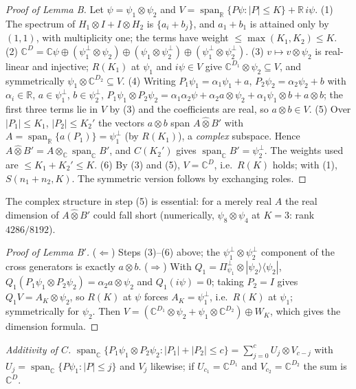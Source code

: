 \documentclass[aps,pra,onecolumn,superscriptaddress,nofootinbib,longbibliography,10pt]{revtex4-2}
\theoremstyle{definition}
\newcommand{\CC}{\mathbb C}
\newcommand{\RR}{\mathbb R}
\newcommand{\spanR}{\operatorname{span}_{\RR}}
\newcommand{\spanC}{\operatorname{span}_{\CC}}
\begin{document}
\begin{proof}[Proof of Lemma B]
Let $\psi=\psi_1\otimes\psi_2$ and $V=\spanR\{P\psi:|P|\le K\}+\RR\,i\psi$.
(1) The spectrum of $H_1\otimes I+I\otimes H_2$ is $\{a_i+b_j\}$, and $a_1+b_1$ is attained only by $(1,1)$, with multiplicity one; the terms have weight $\le\max(K_1,K_2)\le K$.
(2) $\CC^D=\CC\psi\oplus(\psi_1^\perp\otimes\psi_2)\oplus(\psi_1\otimes\psi_2^\perp)\oplus(\psi_1^\perp\otimes\psi_2^\perp)$.
(3) $v\mapsto v\otimes\psi_2$ is real-linear and injective; $R(K_1)$ at $\psi_1$ and $i\psi\in V$ give $\CC^{D_1}\otimes\psi_2\subseteq V$, and symmetrically $\psi_1\otimes\CC^{D_2}\subseteq V$.
(4) Writing $P_1\psi_1=\alpha_1\psi_1+a$, $P_2\psi_2=\alpha_2\psi_2+b$ with $\alpha_i\in\RR$, $a\in\psi_1^\perp$, $b\in\psi_2^\perp$,
$P_1\psi_1\otimes P_2\psi_2=\alpha_1\alpha_2\psi+\alpha_2a\otimes\psi_2+\alpha_1\psi_1\otimes b+a\otimes b$; the first three terms lie in $V$ by (3) and the coefficients are real, so $a\otimes b\in V$.
(5) Over $|P_1|\le K_1$, $|P_2|\le K_2'$ the vectors $a\otimes b$ span $A\hat\otimes B'$ with $A=\spanR\{a(P_1)\}=\psi_1^\perp$ (by $R(K_1)$), a \emph{complex} subspace. Hence $A\hat\otimes B'=A\otimes_{\CC}\spanC B'$, and $C(K_2')$ gives $\spanC B'=\psi_2^\perp$. The weights used are $\le K_1+K_2'\le K$.
(6) By (3) and (5), $V=\CC^D$, i.e.\ $R(K)$ holds; with (1), $S(n_1+n_2,K)$. The symmetric version follows by exchanging roles.
\end{proof}
\noindent The complex structure in step (5) is essential: for a merely real $A$ the real dimension of $A\hat\otimes B'$ could fall short (numerically, $\psi_8\otimes\psi_4$ at $K=3$: rank $4286/8192$).

\begin{proof}[Proof of Lemma B$'$]
($\Leftarrow$) Steps (3)--(6) above; the $\psi_1^\perp\otimes\psi_2^\perp$ component of the cross generators is exactly $a\otimes b$. ($\Rightarrow$) With $Q_1=\Pi^\perp_{\psi_1}\otimes|\psi_2\rangle\langle\psi_2|$, $Q_1(P_1\psi_1\otimes P_2\psi_2)=\alpha_2a\otimes\psi_2$ and $Q_1(i\psi)=0$; taking $P_2=I$ gives $Q_1V=A_K\otimes\psi_2$, so $R(K)$ at $\psi$ forces $A_K=\psi_1^\perp$, i.e.\ $R(K)$ at $\psi_1$; symmetrically for $\psi_2$. Then $V=(\CC^{D_1}\otimes\psi_2+\psi_1\otimes\CC^{D_2})\oplus W_K$, which gives the dimension formula.
\end{proof}
\noindent \emph{Additivity of $C$.} $\spanC\{P_1\psi_1\otimes P_2\psi_2:|P_1|+|P_2|\le c\}=\sum_{j=0}^{c}U_j\otimes V_{c-j}$ with $U_j=\spanC\{P\psi_1:|P|\le j\}$ and $V_j$ likewise; if $U_{c_1}=\CC^{D_1}$ and $V_{c_2}=\CC^{D_2}$ the sum is $\CC^D$.
\end{document}
